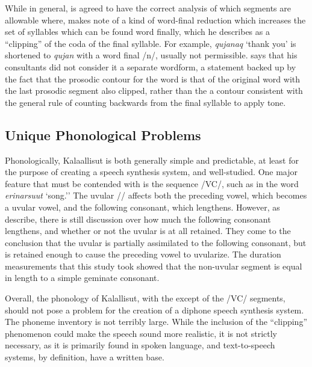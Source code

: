 \documentclass[12pt]{article}
\begin{document}
	While in general, \citet{grammar} is agreed to have the correct analysis of which segments are allowable where, \citet{rischel} makes note of a kind of word-final reduction which increases the set of syllables which can be found word finally, which he describes as a ``clipping'' of the coda of the final syllable. For example, \textit{qujanaq} `thank you' is shortened to \textit{qujan} with a word final /n/, usually not permissible. \citet{rischel} says that his consultants did not consider it a separate wordform, a statement backed up by the fact that the prosodic contour for the word is that of the original word with the last prosodic segment also clipped, rather than the a contour consistent with the general rule of counting backwards from the final syllable to apply tone. \par 

	\subsection{Unique Phonological Problems}

	Phonologically, Kalaallisut is both generally simple and predictable, at least for the purpose of creating a speech synthesis system, and well-studied. One major feature that must be contended with is the sequence /V\textinvscr C/, such as in the word \textit{erinarsuut} `song.'' The uvular /\textinvscr/ affects both the preceding vowel, which becomes a uvular vowel, and the following consonant, which lengthens. However, as \citet{quan} describe, there is still discussion over how much the following consonant lengthens, and whether or not the uvular is at all retained. They come to the conclusion that the uvular is partially assimilated to the following consonant, but is retained enough to cause the preceding vowel to uvularize. The duration measurements that this study took showed that the non-uvular segment is equal in length to a simple geminate consonant. \par

	Overall, the phonology of Kalallisut, with the except of the /V\textinvscr C/ segments, should not pose a problem for the creation of a diphone speech synthesis system. The phoneme inventory is not terribly large. While the inclusion of the ``clipping'' phenomenon could make the speech sound more realistic, it is not strictly necessary, as it is primarily found in spoken language, and text-to-speech systems, by definition, have a written base.\par
\end{document}
